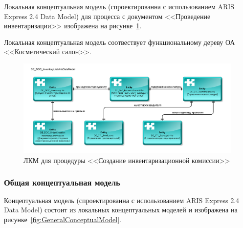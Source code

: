 Локальная концептуальная модель
(спроектированна с использованием ARIS Express 2.4 \cite{ArisExpress} Data Model)
для процесса с документом <<Проведение инвентаризации>>
изображена на рисунке~\ref{fig:DE_DOC_InventoryList}.

Локальная концептуальная модель соотвествует функциональному дереву ОА <<Косметический салон>>.

\begin{figure}[!h]
    \centering

    \includegraphics[width=15cm]
    {assets/ARIS/DataModel/ConceptualModels/DE_DOC_InventoryList.ArisDataModel.pdf}

    \caption{ЛКМ для процедуры <<Создание инвентаризационной комиссии>>}

    \label{fig:DE_DOC_InventoryList}
\end{figure}

% 
% 
% 

\subsubsection{Общая концептуальная модель}

Концептуальная модель
(спроектированна с использованием ARIS Express 2.4 \cite{ArisExpress} Data Model)
состоит из локальных концептуальных моделей и
изображена на рисунке~\ref{fig:GeneralConceptualModel}.

